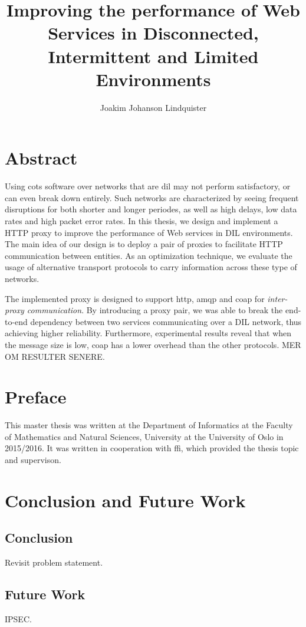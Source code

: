 \documentclass[USenglish]{ifimaster}
\title{Improving the performance of Web Services in Disconnected, Intermittent
and Limited Environments}
\author{Joakim Johanson Lindquister}
\begin{document}
\ififorside{}

\chapter*{Abstract}

Using \gls{cots} software over networks that are \gls{dil} may not perform
satisfactory, or can even break down entirely. Such networks are characterized
by seeing frequent disruptions for both shorter and longer periodes, as well as
high delays, low data rates and high packet error rates. In this thesis, we
design and implement a HTTP proxy to improve the performance of Web services in
DIL environments. The main idea of our design is to deploy a pair of proxies to
facilitate HTTP communication between entities. As an optimization technique, we
evaluate the usage of alternative transport protocols to carry information
across these type of networks.

The implemented proxy is designed to support \gls{http}, \gls{amqp} and
\gls{coap} for \textit{inter-proxy communication}. By introducing a proxy pair,
we was able to break the end-to-end dependency between two services
communicating over a DIL network, thus achieving higher reliability.
Furthermore, experimental results reveal that when the message size is low,
\gls{coap} has a lower overhead than the other protocols. MER OM RESULTER
SENERE.



\chapter*{Preface}

This master thesis was written at the Department of Informatics at the Faculty
of Mathematics and Natural Sciences, University at the University of Oslo in
2015/2016. It was written in cooperation with \gls{ffi}, which provided the
thesis topic and supervison.


\tableofcontents
\listoftables









\chapter{Conclusion and Future Work}
\label{chapter:conclusion}

\section{Conclusion}
Revisit problem statement.

\section{Future Work}

IPSEC.

\pagebreak
\printbibliography{}
\printglossaries{}


\end{document}
